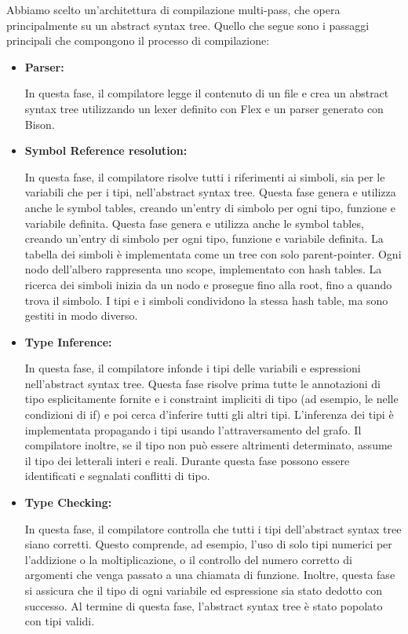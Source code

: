\documentclass[a4paper]{article}
\begin{document}
Abbiamo scelto un'architettura di compilazione multi-pass, che opera principalmente su un abstract syntax tree.
Quello che segue sono i passaggi principali che compongono il processo di compilazione:

\begin{itemize}
    \item \textbf{Parser:}

    In questa fase, il compilatore legge il contenuto di un file e crea un abstract syntax tree utilizzando un lexer definito con Flex e un parser generato con Bison.

    \item \textbf{Symbol Reference resolution:}

    In questa fase, il compilatore risolve tutti i riferimenti ai simboli, sia per le variabili che
    per i tipi, nell'abstract syntax tree. Questa fase genera e utilizza anche le symbol tables,
    creando un'entry di simbolo per ogni tipo, funzione e variabile definita. Questa fase genera e
    utilizza anche le symbol tables, creando un'entry di simbolo per ogni tipo, funzione e variabile
    definita. La tabella dei simboli è implementata come un tree con solo parent-pointer. Ogni nodo
    dell'albero rappresenta uno scope, implementato con hash tables. La ricerca dei simboli inizia
    da un nodo e prosegue fino alla root, fino a quando trova il simbolo. I tipi e i simboli
    condividono la stessa hash table, ma sono gestiti in modo diverso.

    \item \textbf{Type Inference:}

    In questa fase, il compilatore infonde i tipi delle variabili e
    espressioni nell'abstract syntax tree. Questa
    fase risolve prima tutte le annotazioni di tipo esplicitamente fornite e i
    constraint impliciti di tipo (ad esempio, le nelle condizioni di if) e
    poi cerca d'inferire tutti gli altri tipi. L'inferenza dei tipi è
    implementata propagando i tipi usando l'attraversamento del grafo. Il
    compilatore inoltre, se il tipo non può essere altrimenti determinato,
    assume il tipo dei letterali interi e reali. Durante questa fase possono
    essere identificati e segnalati conflitti di tipo.

    \item \textbf{Type Checking:}

    In questa fase, il compilatore controlla che tutti i tipi dell'abstract syntax tree siano
    corretti. Questo comprende, ad esempio, l'uso di solo tipi numerici per l'addizione o la
    moltiplicazione, o il controllo del numero corretto di argomenti che venga passato a una
    chiamata di funzione. Inoltre, questa fase si assicura che il tipo di ogni variabile ed
    espressione sia stato dedotto con successo. Al termine di questa fase, l'abstract syntax tree
    è stato popolato con tipi validi.


\end{itemize}
\end{document}
